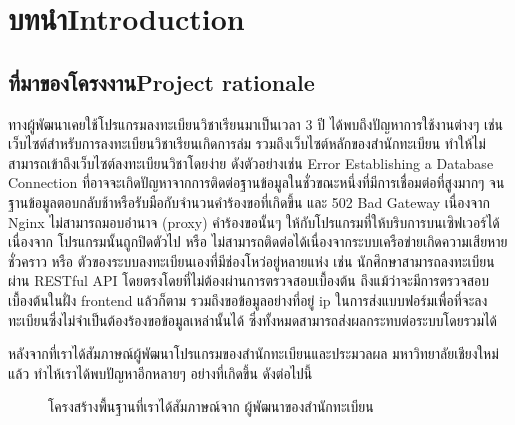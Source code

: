 \chapter{\ifcpe บทนำ\else Introduction\fi}

\section{\ifcpe ที่มาของโครงงาน\else Project rationale\fi}

ทางผู้พัฒนาเคยใช้โปรแกรมลงทะเบียนวิชาเรียนมาเป็นเวลา 3 ปี ได้พบถึงปัญหาการใช้งานต่างๆ เช่น เว็บไซต์สำหรับการลงทะเบียนวิชาเรียนเกิดการล่ม 
รวมถึงเว็บไซต์หลักของสำนักทะเบียน ทำให้ไม่สามารถเข้าถึงเว็บไซต์ลงทะเบียนวิชาโดยง่าย ดังตัวอย่างเช่น Error Establishing a Database Connection ที่อาจจะเกิดปัญหาจากการติดต่อฐานข้อมูลในชั่วขณะหนึ่งที่มีการเชื่อมต่อที่สูงมากๆ จนฐานข้อมูลตอบกลับช้าหรือรับมือกับจำนวนคำร้องขอที่เกิดขึ้น และ 502 Bad Gateway เนื่องจาก Nginx ไม่สามารถมอบอำนาจ (proxy) คำร้องขอนั้นๆ ให้กับโปรแกรมที่ให้บริบการบนเซิฟเวอร์ได้เนื่องจาก โปรแกรมนั้นถูกปิดตัวไป หรือ ไม่สามารถติดต่อได้เนื่องจากระบบเครือข่ายเกิดความเสียหายชั่วคราว หรือ ตัวของระบบลงทะเบียนเองที่มีช่องโหว่อยู่หลายแห่ง เช่น นักศึกษาสามารถลงทะเบียนผ่าน RESTful API โดยตรงโดยที่ไม่ต้องผ่านการตรวจสอบเบื้องต้น ถึงแม้ว่าจะมีการตรวจสอบเบื้องต้นในฝั่ง frontend แล้วก็ตาม รวมถึงขอข้อมูลอย่างที่อยู่ ip ในการส่งแบบฟอร์มเพื่อที่จะลงทะเบียนซึ่งไม่จำเป็นต้องร้องขอข้อมูลเหล่านั้นได้ ซึ่งทั้งหมดสามารถส่งผลกระทบต่อระบบโดยรวมได้

หลังจากที่เราได้สัมภาษณ์ผู้พัฒนาโปรแกรมของสำนักทะเบียนและประมวลผล มหาวิทยาลัยเชียงใหม่แล้ว ทำไห้เราได้พบปัญหาอีกหลายๆ อย่างที่เกิดขึ้น ดังต่อไปนี้

\begin{figure}
    \centering
    \caption{โครงสร้างพื้นฐานที่เราได้สัมภาษณ์จาก ผู้พัฒนาของสำนักทะเบียน}
    \label{fig:reg_infra}
\end{figure}

